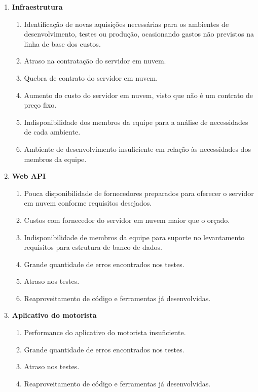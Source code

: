 \begin{description}
\begin{enumerate}[label=\arabic*.]
		\item \textbf{Infraestrutura}
		      \begin{enumerate}[label*=\arabic*.]
			      \item Identificação de novas aquisições necessárias para os ambientes de desenvolvimento, testes ou produção, ocasionando gastos não previstos na linha de base dos custos.
			      \item Atraso na contratação do servidor em nuvem.
			      \item Quebra de contrato do servidor em nuvem.
			      \item Aumento do custo do servidor em nuvem, visto que não é um contrato de preço fixo.
			      \item Indisponibilidade dos membros da equipe para a análise de necessidades de cada ambiente.
			      \item Ambiente de desenvolvimento insuficiente em relação às necessidades dos membros da equipe.
		      \end{enumerate}
		\item \textbf{Web API}
		      \begin{enumerate}[label*=\arabic*.]
			      \item Pouca disponibilidade de fornecedores preparados para oferecer o servidor em nuvem conforme requisitos desejados.
			      \item Custos com fornecedor do servidor em nuvem maior que o orçado.
			      \item Indisponibilidade de membros da equipe para suporte no levantamento requisitos para estrutura de banco de dados.
			      \item Grande quantidade de erros encontrados nos testes.
			      \item Atraso nos testes.
			      \item Reaproveitamento de código e ferramentas já desenvolvidas.
		      \end{enumerate}
		\item \textbf{Aplicativo do motorista}
		      \begin{enumerate}[label*=\arabic*.]
			      \item Performance do aplicativo do motorista insuficiente.
			      \item Grande quantidade de erros encontrados nos testes.
			      \item Atraso nos testes.
			      \item Reaproveitamento de código e ferramentas já desenvolvidas.
		      \end{enumerate}

\end{enumerate}
\end{description}
